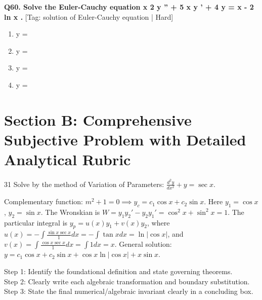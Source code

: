 \noindent\textbf{Q60. Solve the Euler-Cauchy equation x 2 y '' + 5 x y ' + 4 y = x - 2 ln x .} \hfill [Tag: solution of Euler-Cauchy equation | Hard]
\begin{enumerate}[label=(\alph*),topsep=2pt,itemsep=1pt,partopsep=0pt,parsep=0pt]
    \item {{y =}}
    \item {{y =}}
    \item {{y =}}
    \item {{y =}}
\end{enumerate}
\vspace{2mm}


\section{Section B: Comprehensive Subjective Problem with Detailed Analytical Rubric}

\begin{subjectiveq}{3}{1}
Solve by the method of Variation of Parameters: $\frac{d^2 y}{dx^2} + y = \sec x$.
\end{subjectiveq}

\begin{solbox}
Complementary function: $m^2 + 1 = 0 \implies y_c = c_1 \cos x + c_2 \sin x$. Here $y_1 = \cos x$, $y_2 = \sin x$. The Wronskian is $W = y_1 y_2' - y_2 y_1' = \cos^2 x + \sin^2 x = 1$. The particular integral is $y_p = u(x)y_1 + v(x)y_2$, where $u(x) = -\int \frac{\sin x \sec x}{1} dx = -\int \tan x dx = \ln|\cos x|$, and $v(x) = \int \frac{\cos x \sec x}{1} dx = \int 1 dx = x$. General solution: $y = c_1 \cos x + c_2 \sin x + \cos x \ln|\cos x| + x \sin x$.
\end{solbox}

\begin{examinertip}
Step 1: Identify the foundational definition and state governing theorems.\\
Step 2: Clearly write each algebraic transformation and boundary substitution.\\
Step 3: State the final numerical/algebraic invariant clearly in a concluding box.
\end{examinertip}
